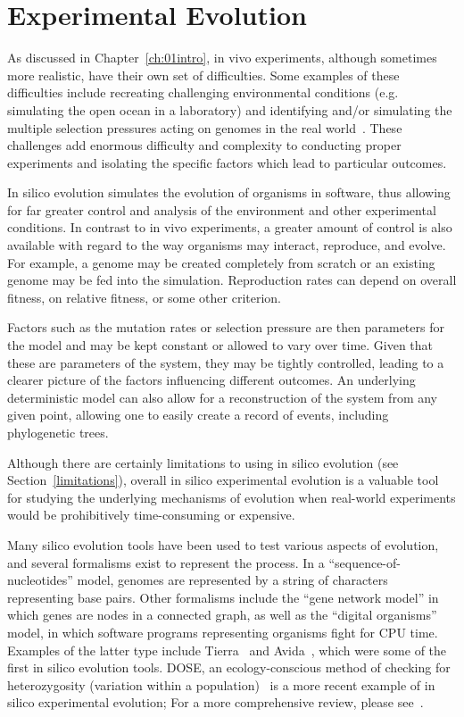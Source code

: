 \section{Experimental Evolution}
As discussed in Chapter~\ref{ch:01intro}, in vivo experiments, although sometimes more realistic, have their own set of difficulties. Some examples of these difficulties include recreating challenging environmental conditions (e.g. simulating the open ocean in a laboratory) and identifying and/or simulating the multiple selection pressures acting on genomes in the real world~\cite{Batut.2013}. These challenges add enormous difficulty and complexity to conducting proper experiments and isolating the specific factors which lead to particular outcomes. 

In silico evolution simulates the evolution of organisms in software, thus allowing for far greater control and analysis of the environment and other experimental conditions. In contrast to in vivo experiments, a greater amount of control is also available with regard to the way organisms may interact, reproduce, and evolve. For example, a genome may be created completely from scratch or an existing genome may be fed into the simulation. Reproduction rates can depend on overall fitness, on relative fitness, or some other criterion. 

Factors such as the mutation rates or selection pressure are then parameters for the model and may be kept constant or allowed to vary over time. Given that these are parameters of the system, they may be tightly controlled, leading to a clearer picture of the factors influencing different outcomes. An underlying deterministic model can also allow for a reconstruction of the system from any given point, allowing one to easily create a record of events, including phylogenetic trees. 

Although there are certainly limitations to using in silico evolution (see Section~\ref{limitations}), overall in silico experimental evolution is a valuable tool for studying the underlying mechanisms of evolution when real-world experiments would be prohibitively time-consuming or expensive.

Many silico evolution tools have been used to test various aspects of evolution, and several formalisms exist to represent the process. In a ``sequence-of-nucleotides'' model, genomes are represented by a string of characters representing base pairs. Other formalisms include the ``gene network model'' in which genes are nodes in a connected graph, as well as the ``digital organisms'' model, in which software programs representing organisms fight for CPU time. Examples of the latter type include Tierra~\cite{Tierra-Ray} and Avida~\cite{Avida-Ofria}, which were some of the first in silico evolution tools. DOSE, an ecology-conscious method of checking for heterozygosity (variation within a population)~\cite{Castillo-DOSE} is a more recent example of in silico experimental evolution;  For a more comprehensive review, please see~\cite{Mozhayskiy-In-Silico-Review}. 
 
